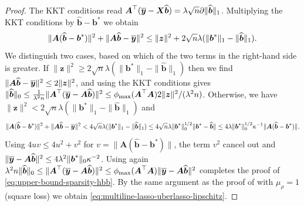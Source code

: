 \documentclass[11pt]{amsart}
\numberwithin{equation}{section}
\numberwithin{equation}{section}
\def\mathbold{\boldsymbol} %
\def\bA{\mathbold{A}}\def\calA{{\cal A}}\def\scrA{{\mathscr A}}\def\Ahat{\widehat{A}}\def\Atil{{\widetilde A}}
\def\bb{\mathbold{b}}\def\bhat{\widehat{b}}\def\btil{\widetilde{b}}
\def\hbb{{\widehat{\bb}}}\def\tbb{{\widetilde{\bb}}}\def\bbbar{{\overline \bb}}
\def\bX{\mathbold{X}}\def\hbX{{\widehat{\bX}}}\def\tbX{{\widetilde{\bX}}}\def\bXbar{{\overline \bX}}
\def\bz{\mathbold{z}}\def\zhat{\widehat{z}}\def\ztil{\widetilde{z}}\def\zbar{{\overline z}}
\begin{document}
\begin{proof}
    The KKT conditions read $\bA^\top(\bybar-\bX\hbb) = \lambda\sqrt n
    \partial\|\hbb\|_1$. Multiplying the KKT conditions by
    $\hbb-\bb^*$ we obtain
    $$
    \|\bA(\hbb-\bb^*)\|^2
    +
    \|\bA\hbb - \bybar\|^2
    \le
    \|\bz\|^2
    + 2 \sqrt n \lambda(\|\bb^*\|_1 - \|\hbb\|_1).
    $$
    We distinguish two cases, based on which of the two terms in the
    right-hand side is greater. If $\|\bz\|^2\ge 2 \sqrt n \lambda(\|\bb^*\|_1 - \|\hbb\|_1)$ then we find
    $\|\bA\hbb - \bybar\|^2\le 2 \|\bz\|^2$, and using the KKT conditions
    gives
    $\|\hbb\|_0\le \frac{1}{\lambda^2n}\|\bA^\top(\bybar-\bA\hbb)\|^2
    \le \phi_{\max}(\bA^\top\bA) 2 \|\bz\|^2 / (\lambda^2n)$.
    Otherwise, we have
    $\|\bz\|^2< 2 \sqrt n \lambda(\|\bb^*\|_1 - \|\hbb\|_1)$
    and
    $$
    \|\bA(\hbb-\bb^*)\|^2
    +
    \|\bA\hbb - \bybar\|^2
    < 4\sqrt n \lambda(\|\bb^*\|_1 - \|\hbb\|_1)
    \le 4 \sqrt{n} \lambda\|\bb^*\|_0^{1/2}\|\bb^*-\hbb\|
    \le 4 \lambda \|\bb^*\|_0^{1/2}\kappa^{-1} \|\bA(\hbb-\bb^*)\|.
    $$
    Using $4uv\le 4u^2+v^2$ for $v=\|\bA(\hbb-\bb^*)\|$, the term $v^2$
    cancel out and
    $\|\bybar-\bA\hbb\|^2\le 4\lambda^2\|\bb^*\|_0 \kappa^{-2}$.
    Using again
    $\lambda^2n\|\hbb\|_0\le\|\bA^\top(\bybar-\bA\hbb)\|^2
    \le \phi_{\max}(\bA^\top\bA)\|\bybar-\bA\hbb\|^2$
    completes the proof of \eqref{eq:upper-bound-sparsity-hbb}.
    By the same argument as the proof of  with $\mu_\rho=1$
    (square loss) we 
    obtain \eqref{eq:multiline-lasso-uberlasso-lipschitz}.
\end{proof}
\end{document}
